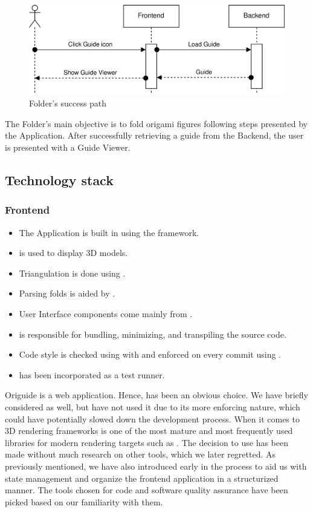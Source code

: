 \begin{figure}[H]
	\caption{Folder's success path}
  \centering
    \includegraphics[width=\textwidth]{assets/3-folder-flow.png}
\end{figure}

The Folder's main objective is to fold origami figures following steps presented by the Application. After successfully retrieving a guide from the Backend, the user is presented with a Guide Viewer.

\subsection{Technology stack}

\subsubsection{Frontend}

\begin{itemize}
	\item The Application is built in  using the  framework. 
	\item {} is used to display 3D models.
	\item Triangulation is done using . 
	\item Parsing folds is aided by .
	\item User Interface components come mainly from .
	\item {} is responsible for bundling, minimizing, and transpiling the source code.
	\item Code style is checked using  with  and enforced on every commit using .
	\item {} has been incorporated as a test runner.
\end{itemize}

Origuide is a web application. Hence,  has been an obvious choice. We have briefly considered  as well, but have not used it due to its more enforcing nature, which could have potentially slowed down the development process. When it comes to 3D rendering frameworks  is one of the most mature and most frequently used libraries for modern rendering targets such as . The decision to use  has been made without much research on other tools, which we later regretted. As previously mentioned, we have also introduced  early in the process to aid us with state management and organize the frontend application in a structurized manner. The tools chosen for code and software quality assurance have been picked based on our familiarity with them.


